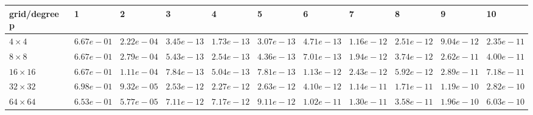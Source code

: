 \begin{tabular}{lllllllllll}
\hline
 grid/degree p   & 1          & 2          & 3          & 4          & 5          & 6          & 7          & 8          & 9          & 10         \\
\hline
 $4 \times 4$    & $6.67e-01$ & $2.22e-04$ & $3.45e-13$ & $1.73e-13$ & $3.07e-13$ & $4.71e-13$ & $1.16e-12$ & $2.51e-12$ & $9.04e-12$ & $2.35e-11$ \\
 $8 \times 8$    & $6.67e-01$ & $2.79e-04$ & $5.43e-13$ & $2.54e-13$ & $4.36e-13$ & $7.01e-13$ & $1.94e-12$ & $3.74e-12$ & $2.62e-11$ & $4.00e-11$ \\
 $16 \times 16$  & $6.67e-01$ & $1.11e-04$ & $7.84e-13$ & $5.04e-13$ & $7.81e-13$ & $1.13e-12$ & $2.43e-12$ & $5.92e-12$ & $2.89e-11$ & $7.18e-11$ \\
 $32 \times 32$  & $6.98e-01$ & $9.32e-05$ & $2.53e-12$ & $2.27e-12$ & $2.63e-12$ & $4.10e-12$ & $1.14e-11$ & $1.71e-11$ & $1.19e-10$ & $2.82e-10$ \\
 $64 \times 64$  & $6.53e-01$ & $5.77e-05$ & $7.11e-12$ & $7.17e-12$ & $9.11e-12$ & $1.02e-11$ & $1.30e-11$ & $3.58e-11$ & $1.96e-10$ & $6.03e-10$ \\
\hline
\end{tabular}